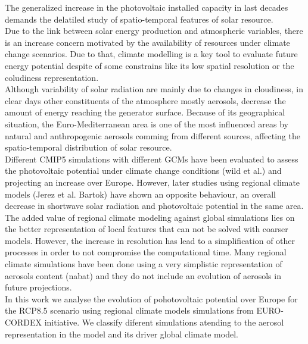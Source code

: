     The generalized increase in the photovoltaic installed capacity in last decades demands the delatiled study of spatio-temporal features of solar resource.\\

  Due to the link between solar energy production and atmospheric variables, there is an increase concern motivated by the availability of resources under climate change scenarios. Due to that, climate modelling is a key tool to evaluate future energy potential despite of some constrains like its low spatial resolution or the coludiness representation.\\
  
   Although variability of solar radiation are mainly due to changes in cloudiness, in clear days other constituents of the atmosphere mostly aerosols, decrease the amount of energy reaching the generator surface. Because of its geographical situation, the Euro-Mediterranean area is one of the most influenced areas by natural and anthropogenic aerosols comming from different sources, affecting the spatio-temporal distribution of solar resource.\\

   Different CMIP5 simulations with different GCMs have been evaluated to assess the photovoltaic potential under climate change conditions (wild et al.) and projecting an increase over Europe. However, later studies using regional climate models (Jerez et al. Bartok) have shown an opposite behaviour, an overall decrease in shortwave solar radiation and photovoltaic potential in the same area.\\

   The added value of regional climate modeling against global simulations lies on the better representation of local features that can not be solved with coarser models. However, the increase in resolution has lead to a simplification of other processes in order to not compromise the computational time. Many regional climate simulations have been done using a very simplistic representation of aerosols content (nabat) and they do not include an evolution of aerosols in future projections.\\
   
   In this work we analyse the evolution of pohotovoltaic potential over Europe for the RCP8.5 scenario using regional climate models simulations from EURO-CORDEX initiative. We classify diferent simulations atending to the aerosol representation in the model and its driver global climate model.\\

